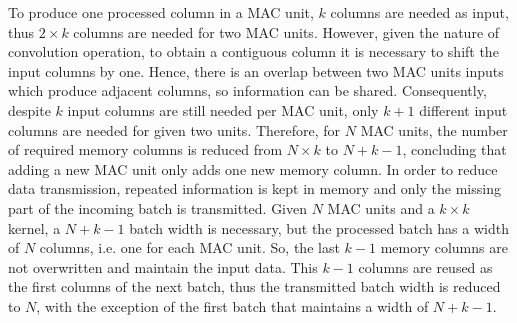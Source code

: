 \documentclass[a1paper,portrait,fontscale=0.43]{baposter}
\begin{document}
\begin{poster}
{\begin{multicols}{2}
To produce one processed column in a MAC unit, $k$ columns are needed as input,
thus $2 \times k$ columns are needed for two MAC units. 
However, given the nature of convolution operation, to obtain a contiguous
column it is necessary to shift the input columns by one. Hence, there is an
overlap between two MAC units inputs which produce adjacent columns, so information can
be shared.
Consequently, despite $k$ input columns are still needed per MAC unit, only $k+1$
different input columns are needed for given two units. 
Therefore, for $N$ MAC units, the number of required memory columns is reduced from $N \times k$ to $N+k-1$, concluding
that adding a new MAC unit only adds one new memory column.
In order to reduce data transmission, repeated
information is kept in memory and only the missing part of 
the incoming batch is transmitted.
Given $N$ MAC units and a 
$k\times k$ kernel, a $N+k-1$
batch width is necessary, but the processed batch has a width of $N$ columns, i.e.
one for each MAC unit. So, the last $k-1$ memory columns are not overwritten and
maintain the input data. This $k-1$ columns are reused as the first columns
of the next batch, thus the transmitted batch width is reduced to $N$, with the exception of
the first batch that maintains a width of $N+k-1$.


\end{multicols}}
\end{poster}
\end{document}
